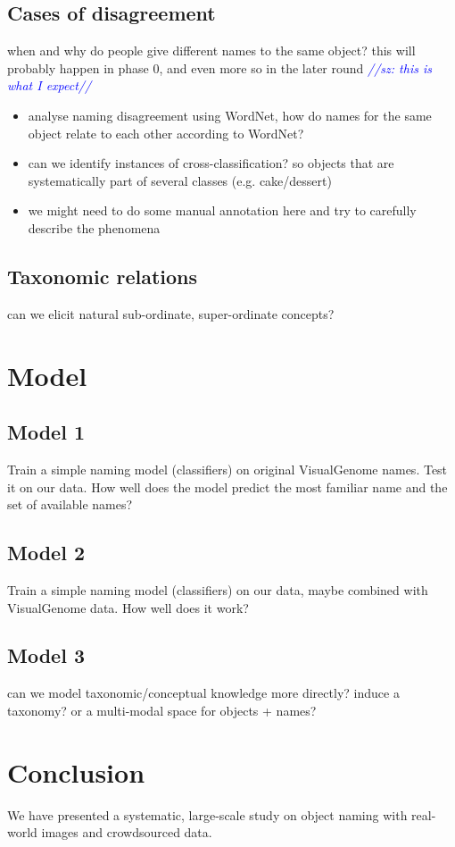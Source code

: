 \documentclass[11pt]{article}
\newcommand{\sz}[1]{\textcolor{blue}{\emph{//sz: #1//}}}
\begin{document}
\subsection{Cases of disagreement}

when and why do people give different names to the same object? this will probably happen in phase 0, and even more so in the later round \sz{this is what I expect}

\begin{itemize}
\item  analyse naming disagreement using WordNet, how do names for the same object relate to each other according to WordNet?
\item can we identify instances of cross-classification? so objects that are systematically part of several classes (e.g. cake/dessert)
\item we might need to do some manual annotation here and try to carefully describe the phenomena
\end{itemize}

\subsection{Taxonomic relations}

can we elicit natural sub-ordinate, super-ordinate concepts?

\section{Model}

\subsection{Model 1}
Train a simple naming model (classifiers) on original VisualGenome names. Test it on our data. How well does the model predict the most familiar name and the set of available names?

\subsection{Model 2}
Train a simple naming model (classifiers) on our data, maybe combined with VisualGenome data. How well does it work?

\subsection{Model 3}

can we model taxonomic/conceptual knowledge more directly? induce a taxonomy? or a multi-modal space for objects + names?

\section{Conclusion}

We have presented a systematic, large-scale study on object naming with real-world images and crowdsourced data.



\end{document}
